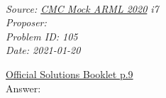 \SSbreak\\
\emph{Source: \href{https://artofproblemsolving.com/community/c4h2127438p15524285}{CMC Mock ARML 2020}  i7}\\
\emph{Proposer: \Pnjoy}\\ %
\emph{Problem ID: 105}\\
\emph{Date: 2021-01-20}\\
\SSbreak

\bigskip

\begin{solution}\hfil\medskip
  
\href{http://cmc.ericshen.net/CMC-2020/ARML-Sol-2020.pdf}{Official Solutions Booklet p.9}\\
Answer: 
\end{solution}\bigskip
